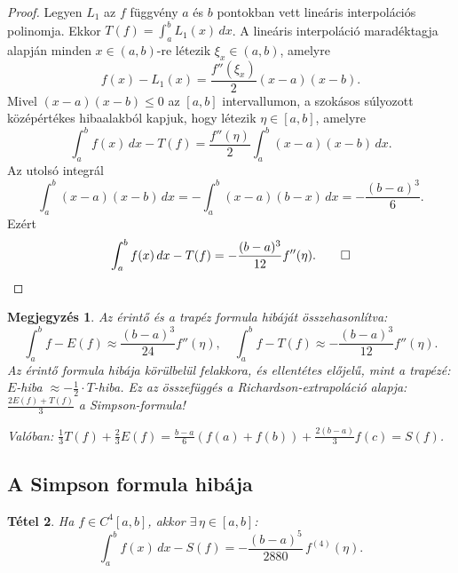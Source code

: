 \documentclass[a4paper,12pt]{article}
\theoremstyle{mydef}
\newtheorem{tetel}{Tétel}[section]
\newtheorem{megjegyzes}[tetel]{Megjegyzés}
\begin{document}
\begin{proof}
Legyen $L_1$ az $f$ függvény $a$ és $b$ pontokban vett lineáris interpolációs polinomja.
Ekkor $T(f)=\int_a^b L_1(x)\,dx$. A lineáris interpoláció maradéktagja alapján minden
$x\in(a,b)$-re létezik $\xi_x\in(a,b)$, amelyre
\[
  f(x)-L_1(x)=\frac{f''(\xi_x)}{2}(x-a)(x-b).
\]
Mivel $(x-a)(x-b)\le 0$ az $[a,b]$ intervallumon, a szokásos súlyozott középértékes
hibaalakból kapjuk, hogy létezik $\eta\in[a,b]$, amelyre
\[
  \int_a^b f(x)\,dx-T(f)
  = \frac{f''(\eta)}{2}\int_a^b (x-a)(x-b)\,dx.
\]
Az utolsó integrál
\[
  \int_a^b (x-a)(x-b)\,dx
  = -\int_a^b (x-a)(b-x)\,dx
  = -\frac{(b-a)^3}{6}.
\]
Ezért
\[
  \int_a^b f(x)\,dx - T(f) = -\frac{(b-a)^3}{12}f''(\eta). \qed
\]
\end{proof}

\begin{megjegyzes}
Az érintő és a trapéz formula hibáját összehasonlítva:
\[
  \int_a^b f - E(f) \approx \frac{(b-a)^3}{24}f''(\eta),\quad
  \int_a^b f - T(f) \approx -\frac{(b-a)^3}{12}f''(\eta).
\]
Az érintő formula hibája körülbelül \emph{felakkora, és ellentétes előjelű}, mint a trapézé:
$E$-hiba $\approx -\tfrac{1}{2}\cdot T$-hiba. Ez az összefüggés a Richardson-extrapoláció
alapja: $\tfrac{2E(f)+T(f)}{3}$ a Simpson-formula!

Valóban: $\tfrac{1}{3}T(f) + \tfrac{2}{3}E(f) = \tfrac{b-a}{6}(f(a)+f(b)) + \tfrac{2(b-a)}{3}f(c) = S(f)$.
\end{megjegyzes}

\subsection*{A Simpson formula hibája}

\begin{mdframed}[backgroundcolor=thmbg,linewidth=0pt,innertopmargin=8pt,innerbottommargin=8pt]
\begin{tetel}
\label{tetel:simpsonhiba}
Ha $f \in C^4[a,b]$, akkor $\exists\,\eta \in [a,b]$:
\[
  \int_a^b f(x)\,dx - S(f) = -\frac{(b-a)^5}{2880}\,f^{(4)}(\eta).
\]
\end{tetel}
\end{mdframed}
\end{document}
